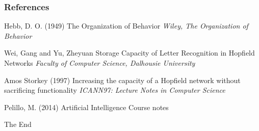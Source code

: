 \documentclass{beamer}
\begin{document}
\begin{frame}
\frametitle{References}
\footnotesize{
\begin{thebibliography}{99} %

 Hebb, D. O. (1949)
\newblock The Organization of Behavior
\newblock \emph{Wiley, The Organization of Behavior}

 Wei, Gang and Yu, Zheyuan
\newblock Storage Capacity of Letter Recognition in Hopfield Networks
\newblock \emph{Faculty of Computer Science, Dalhousie University}

 Amos Storkey (1997)
\newblock Increasing the capacity of a Hopfield network without sacrificing functionality
\newblock \emph{ICANN97: Lecture Notes in Computer Science}

 Pelillo, M. (2014)
\newblock Artificial Intelligence Course notes

\end{thebibliography}
}
\end{frame}


\begin{frame}
\Huge{\centerline{The End}}
\end{frame}

\end{document}
